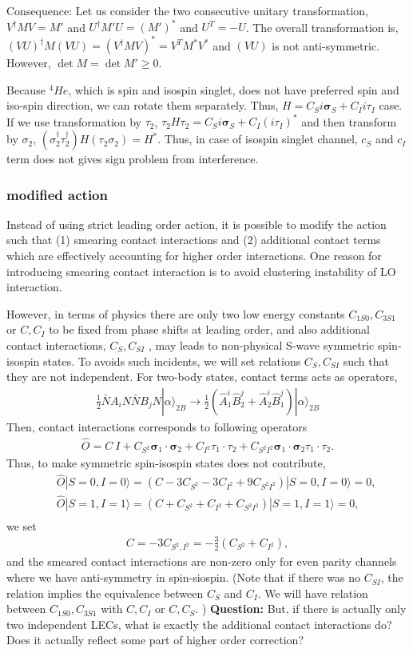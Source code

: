 \documentclass[10pt]{book}
\def\bm{\boldsymbol}
\newcommand{\bea}{\begin{eqnarray}}
\newcommand{\eea}{\end{eqnarray}}
\newcommand{\no}{\nonumber \\}
\def\vs{{\bm \sigma}}
\def\ra{\rangle}
\begin{document}
Consequence: Let us consider the two consecutive unitary transformation, 
$V^\dagger M V=M'$ and $U^\dagger M' U= (M')^*$ and $U^T=-U$. The overall
transformation is, $(VU)^\dagger M (VU)=(V^\dagger M V)^*=V^T M^* V^*$ 
and $(VU)$ is not anti-symmetric. However, $\det M=\det M'\geq 0$. 

Because ${}^4He$, which is spin and isospin singlet, does not have preferred
spin and iso-spin direction, we can rotate them separately. 
Thus, $H=C_S i\vs_S +C_I i \tau_I$ case. If we use transformation by $\tau_2$,
$\tau_2 H\tau_2 = C_S i\vs_S +C_I(i\tau_I)^*$ and then transform by $\sigma_2$,
$(\sigma_2^\dagger\tau_2^\dagger) H (\tau_2\sigma_2)=H^*$. 
Thus, in case of isospin singlet channel, $c_S$ and $c_I$ term does not gives 
sign problem from interference. 


\subsubsection{modified action}  
Instead of using strict leading order action,
it is possible to modify the action such that (1) smearing contact interactions
and (2) additional contact terms which are effectively accounting for higher order
interactions. One reason for introducing smearing contact interaction is 
to avoid clustering instability of LO interaction. 

However, in terms of physics there are only two low energy constants $C_{1S0}, C_{3S1}$
or $C,C_{I}$
to be fixed from phase shifts at leading order, and also
additional contact interactions, $C_{S},C_{SI}$ , may leads to non-physical
S-wave symmetric spin-isospin states. 
To avoids such incidents, we will set relations
$C_{S},C_{SI}$ such that they are not independent.  
For two-body states, contact terms acts as operators,
\bea 
\frac{1}{2}\bar{N}A_iN \bar{N}B_jN|\alpha\ra_{2B}\to 
\frac{1}{2}(\hat{A}_{1}^i \hat{B}_2^{j}+\hat{A}_{2}^i \hat{B}_1^{j})|\alpha\ra_{2B}
\eea  
Then, contact interactions corresponds to following operators
\bea
\hat{O}=C\ I+ C_{S^2}\vs_1\cdot\vs_2+C_{I^2}\tau_1\cdot\tau_2+C_{S^2I^2}\vs_1\cdot\vs_2\tau_1\cdot\tau_2.
\eea 
Thus, to make symmetric spin-isospin states does not contribute,
\bea 
& &\hat{O}|S=0,I=0\ra=(C-3C_{S^2}-3C_{I^2}+9C_{S^2I^2})|S=0,I=0\ra=0,\no 
& &\hat{O}|S=1,I=1\ra=(C+C_{S^2}+C_{I^2}+C_{S^2I^2})|S=1,I=1\ra=0,\no 
\eea 
we set
\bea 
C=-3C_{S^2,I^2}=-\frac{3}{2}(C_{S^2}+C_{I^2}),
\eea 
and the smeared contact interactions are non-zero only for even parity channels
where we have anti-symmetry in spin-siospin.
(Note that if there was no $C_{SI}$, the relation
implies the equivalence between $C_{S}$ and $C_{I}$.
We will have relation between $C_{1S0}, C_{3S1}$ with $C,C_{I}$
or $C,C_{S}$.
)
{\bf Question:} But, if there is actually only two independent LECs,
                what is exactly the additional contact interactions do? 
                Does it actually reflect some part of higher order correction?
\end{document}
